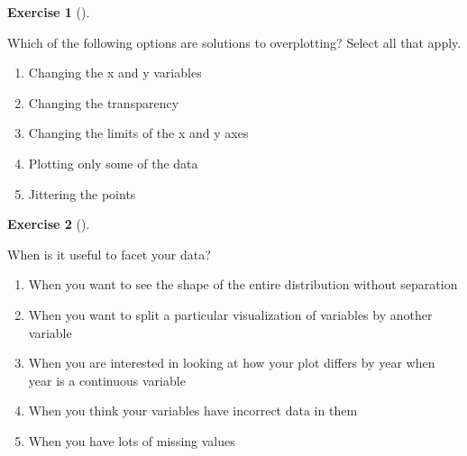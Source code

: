 \documentclass[
  letterpaper,
  DIV=11,
  numbers=noendperiod]{scrreprt}
\providecommand{\tightlist}{%
  \setlength{\itemsep}{0pt}\setlength{\parskip}{0pt}}\usepackage{longtable,booktabs,array}
\theoremstyle{definition}
\newtheorem{exercise}{Exercise}[chapter]
\theoremstyle{remark}
\begin{document}
\begin{exercise}[]\protect\hypertarget{exr-ch02-c03}{}\label{exr-ch02-c03}

Which of the following options are solutions to overplotting? Select all
that apply.

\begin{enumerate}
\def\labelenumi{\alph{enumi})}
\tightlist
\item
  Changing the x and y variables
\item
  Changing the transparency
\item
  Changing the limits of the x and y axes
\item
  Plotting only some of the data
\item
  Jittering the points
\end{enumerate}

\end{exercise}

\begin{exercise}[]\protect\hypertarget{exr-ch02-c04}{}\label{exr-ch02-c04}

When is it useful to facet your data?

\begin{enumerate}
\def\labelenumi{\alph{enumi})}
\tightlist
\item
  When you want to see the shape of the entire distribution without
  separation
\item
  When you want to split a particular visualization of variables by
  another variable
\item
  When you are interested in looking at how your plot differs by year
  when year is a continuous variable
\item
  When you think your variables have incorrect data in them
\item
  When you have lots of missing values
\end{enumerate}

\end{exercise}
\end{document}
